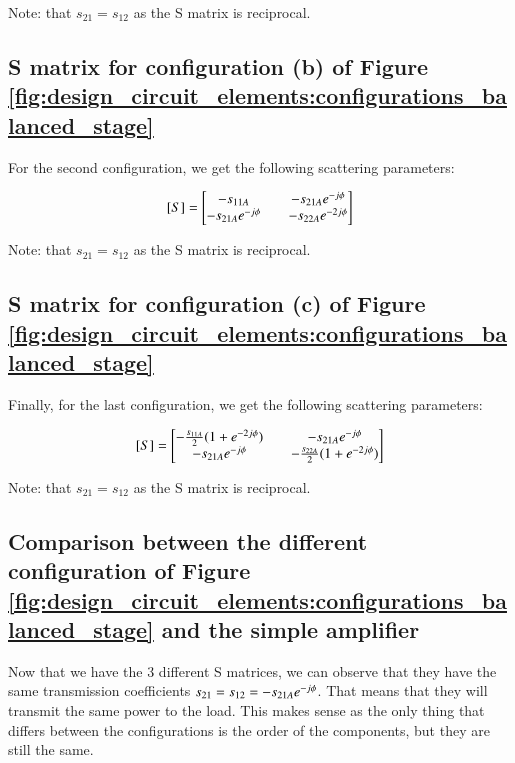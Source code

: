 \documentclass[12pt]{report} %
\begin{document}
Note: that $s_{21} = s_{12}$ as the S matrix is reciprocal.

\subsection{S matrix for configuration (b) of Figure \ref{fig:design_circuit_elements:configurations_balanced_stage}}

For the second configuration, we get the following scattering parameters:

\[
[S] = \begin{bmatrix}
- s_{11A} & \quad - s_{21A} \* e^{- j \* \phi} \\
- s_{21A} \* e^{- j \* \phi} & \quad - s_{22A} \* e^{-2 \* j \* \phi} \\
\end{bmatrix}
\]

Note: that $s_{21} = s_{12}$ as the S matrix is reciprocal.

\subsection{S matrix for configuration (c) of Figure \ref{fig:design_circuit_elements:configurations_balanced_stage}}

Finally, for the last configuration, we get the following scattering parameters:

\[
[S] = \begin{bmatrix}
- \frac{s_{11A}}{2} \* (1 + e^{-2 \* j \* \phi}) & \quad - s_{21A} \* e^{- j \* \phi} \\
- s_{21A} \* e^{- j \* \phi} & \quad - \frac{s_{22A}}{2} \* (1 + e^{-2 \* j \* \phi}) \\
\end{bmatrix}
\]

Note: that $s_{21} = s_{12}$ as the S matrix is reciprocal.

\subsection{Comparison between the different configuration of Figure \ref{fig:design_circuit_elements:configurations_balanced_stage} and the simple amplifier}

Now that we have the 3 different S matrices, we can observe that they have the same transmission coefficients $s_{21} = s_{12} = - s_{21A} \* e^{- j \* \phi}$. That means that they will transmit the same power to the load. This makes sense as the only thing that differs between the configurations is the order of the components, but they are still the same.
\end{document}
